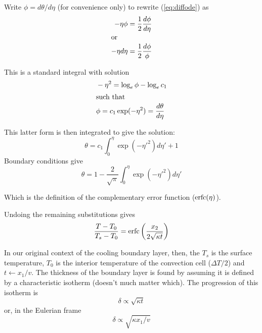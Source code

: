 \documentclass[10pt]{article}
\begin{document}
	Write $\phi = d\theta / d\eta$ (for convenience only) to rewrite (\ref{eq:diffode})
	as
			\begin{align}
				-\eta \phi &= \frac{1}{2} \frac{d \phi}{d \eta}		\\
			\intertext{or}
				-\eta d\eta &= \frac{1}{2} \frac{d\phi}{\phi}	
			\end{align}	
	
	This is a standard integral with solution
			\begin{align}
				& -\eta^2 = \log_e \phi -\log_e c_1 \\
			\intertext{such that}
				& \phi = c_1 \exp(-\eta^2) = \frac{d\theta}{d\eta}
			\end{align}	
		
	This latter form is then integrated to give the solution:
		\begin{equation}
			\theta = c_1 \int_0^\eta 	\exp(-{\eta'}^2) d\eta' +1
		\end{equation}	
	Boundary conditions give	
		\begin{equation}
			\theta = 1- \frac{2}{\sqrt{\pi}} \int_0^\eta\exp(-{\eta'}^2) d\eta'
		\end{equation}	
		
	Which is the definition of the complementary error function ($\mbox{\rm erfc}(\eta)$).	
			
	Undoing the remaining substitutions gives
		\begin{equation}
				\frac{T-T_0}{T_s-T_0} 	= \mbox{\rm erfc} \left(   \frac{x_2}{2\sqrt{\kappa t}} \right)
		\end{equation}
		
	In our original context of the cooling boundary layer, then, the $T_	s$ is the surface
	temperature, $T_0$ is the interior temperature of the convection cell ($\Delta T /2$)
	and $t \leftarrow x_1/v$. The thickness of the boundary layer is found by assuming
	it is defined by a characteristic isotherm (doesn't much matter which). The
	progression of this isotherm is 
		\begin{equation}
			\delta \propto \sqrt{\kappa t}  
		\end{equation}
	or, in the Eulerian frame 
		\begin{equation}
			\delta \propto \sqrt{\kappa x_1 / v}  
		\end{equation}	
			
\end{document}
